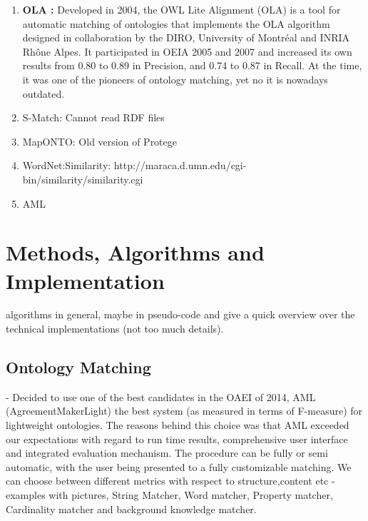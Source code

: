 \documentclass[runningheads,a4paper]{../../StyleFiles/llncs}
\begin{document}
\begin{enumerate}
	\item \textbf{OLA \cite{euzenat2004ontology}:} Developed in 2004, the OWL Lite Alignment (OLA) is a tool for automatic matching of ontologies that implements the OLA algorithm designed in collaboration by the DIRO, University of Montréal and INRIA Rhône Alpes. It participated in OEIA 2005 \cite{euzenat2005ola} and 2007 \cite{djoufak2007ola} and increased its own results from 0.80 to 0.89 in Precision, and 0.74 to 0.87 in Recall. At the time, it was one of the pioneers of ontology matching, yet no it is nowadays outdated.

	\item S-Match: Cannot read RDF files
	\item MapONTO: Old version of Protege
	\item WordNet:Similarity: http://maraca.d.umn.edu/cgi-bin/similarity/similarity.cgi
	\item AML
\end{enumerate}

\section{Methods, Algorithms and Implementation}
 algorithms in general, maybe in pseudo-code and give a quick overview over the technical implementations (not too much details).

\subsection{Ontology Matching}
- Decided to use one of the best candidates in the OAEI of 2014, AML (AgreementMakerLight) the best system (as measured in terms of F-measure) for lightweight ontologies. The reasons behind this choice was that AML exceeded our expectations with regard to run time results, comprehensive user interface and integrated evaluation mechanism. The procedure can be fully or semi automatic, with the user being presented to a fully customizable matching. We can choose between different metrics with respect to structure,content etc 
-examples with pictures, String Matcher, Word matcher, Property matcher, Cardinality matcher and background knowledge matcher.
\end{document}
